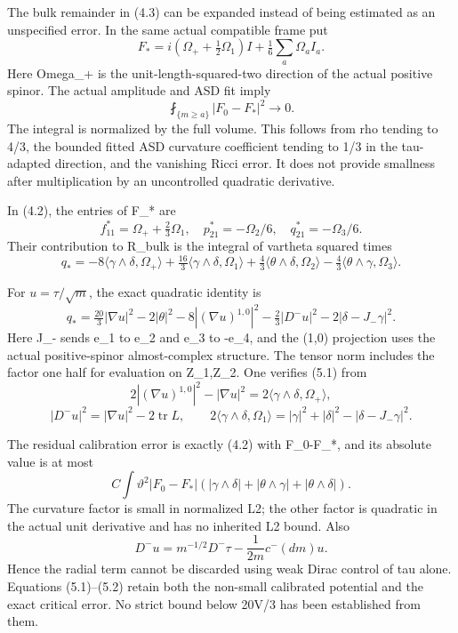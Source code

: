 \documentclass[
  10pt,
]{article}
\begin{document}
The bulk remainder in (4.3) can be expanded instead of being estimated
as an unspecified error. In the same actual compatible frame put \[
 F_*=i(\Omega_++\tfrac12\Omega_1)I
                               +\tfrac16\sum_a\Omega_a I_a.
\] Here Omega\_+ is the unit-length-squared-two direction of the actual
positive spinor. The actual amplitude and ASD fit imply \[
 \fint_{\{m\ge a\}}|F_0-F_*|^2\longrightarrow0.
\] The integral is normalized by the full volume. This follows from rho
tending to 4/3, the bounded fitted ASD curvature coefficient tending to
1/3 in the tau-adapted direction, and the vanishing Ricci error. It does
not provide smallness after multiplication by an uncontrolled quadratic
derivative.

In (4.2), the entries of F\_* are \[
 f_{11}^*=\Omega_++\tfrac23\Omega_1,\quad
 p_{21}^*=-\Omega_2/6,\quad q_{21}^*=-\Omega_3/6.
\] Their contribution to R\_bulk is the integral of vartheta squared
times \[
 q_*=-8\langle\gamma\wedge\delta,\Omega_+\rangle
       +\tfrac{16}{3}\langle\gamma\wedge\delta,\Omega_1\rangle
       +\tfrac43\langle\theta\wedge\delta,\Omega_2\rangle
       -\tfrac43\langle\theta\wedge\gamma,\Omega_3\rangle.
\]

For \(u=\tau/\sqrt m\), the exact quadratic identity is \[
 \boxed{q_*=\tfrac{20}{3}|\nabla u|^2-2|\theta|^2
       -8|(\nabla u)^{1,0}|^2-\tfrac23|D^-u|^2
                                    -2|\delta-J_-\gamma|^2.}   \tag{5.1}
\] Here J\_- sends e\_1 to e\_2 and e\_3 to -e\_4, and the (1,0)
projection uses the actual positive-spinor almost-complex structure. The
tensor norm includes the factor one half for evaluation on Z\_1,Z\_2.
One verifies (5.1) from \[
 2|(\nabla u)^{1,0}|^2-|\nabla u|^2
                               =2\langle\gamma\wedge\delta,\Omega_+\rangle,
\] \[
 |D^-u|^2=|\nabla u|^2-2\operatorname{tr}L,\qquad
 2\langle\gamma\wedge\delta,\Omega_1\rangle
             =|\gamma|^2+|\delta|^2-|\delta-J_-\gamma|^2.
\]

The residual calibration error is exactly (4.2) with F\_0-F\_*, and its
absolute value is at most \[
 C\int\vartheta^2|F_0-F_*|
       (|\gamma\wedge\delta|+|\theta\wedge\gamma|+|\theta\wedge\delta|).
                                                               \tag{5.2}
\] The curvature factor is small in normalized L2; the other factor is
quadratic in the actual unit derivative and has no inherited L2 bound.
Also \[
 D^-u=m^{-1/2}D^-\tau-\frac1{2m}c^-(dm)u.
\] Hence the radial term cannot be discarded using weak Dirac control of
tau alone. Equations (5.1)--(5.2) retain both the non-small calibrated
potential and the exact critical error. No strict bound below 20V/3 has
been established from them.
\end{document}
